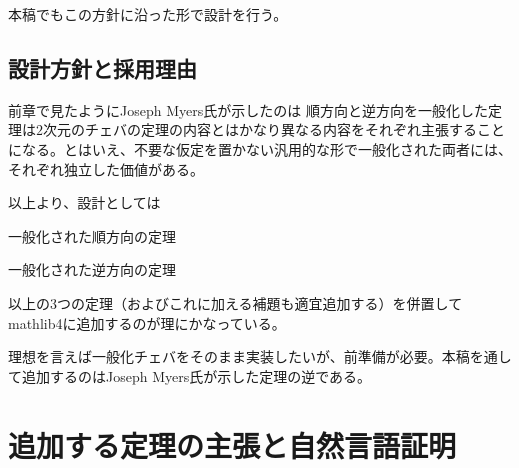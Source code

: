 \documentclass[a4paper,12pt]{bxjsbook}
\newlength{\customindent}
\newenvironment{body}{
  \par
  \begingroup
  \setlength{\leftskip}{\customindent}
  \setlength{\rightskip}{0pt}
  \setlength{\parindent}{1em}
  \setlength{\displayindent}{\customindent}
  \setlength{\displaywidth}{\dimexpr\linewidth-\customindent\relax}
}{
  \par
  \endgroup
}
\theoremstyle{theorem}
\begin{document}
\begin{body}
\begin{body}
        \indent 本稿でもこの方針に沿った形で設計を行う。

    \end{body}

    \subsection{設計方針と採用理由}
    \begin{body}
        \indent 前章で見たようにJoseph Myers氏が示したのは
        \indent 順方向と逆方向を一般化した定理は$2$次元のチェバの定理の内容とはかなり異なる内容をそれぞれ主張することになる。とはいえ、不要な仮定を置かない汎用的な形で一般化された両者には、それぞれ独立した価値がある。

        \indent 以上より、設計としては

        \begin{bodyitemize}
            \item 一般化された順方向の定理
            \item 一般化された逆方向の定理
        \end{bodyitemize}
        \indent 以上の3つの定理（およびこれに加える補題も適宜追加する）を併置してmathlib4に追加するのが理にかなっている。

        

        \indent 理想を言えば一般化チェバをそのまま実装したいが、前準備が必要。本稿を通して追加するのはJoseph Myers氏が示した定理の逆である。



    \end{body}

    \section{追加する定理の主張と自然言語証明}


\end{body}
\end{document}
